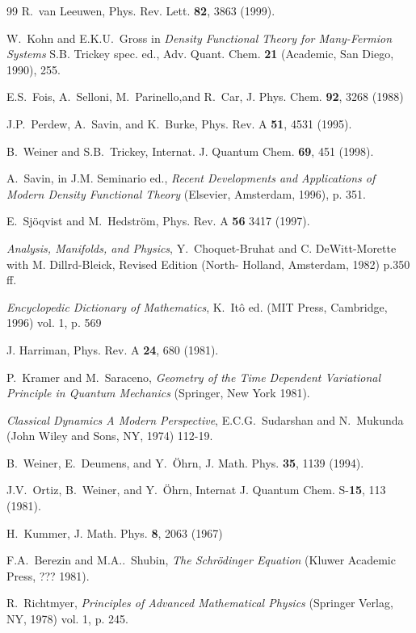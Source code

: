 \documentclass[aps,preprint]{revtex4}%
\begin{document}
\begin{thebibliography}{99}
R.~van Leeuwen, Phys. Rev. Lett. \textbf{82}, 3863 (1999).

W.~Kohn and E.K.U.~Gross in \textit{Density Functional
Theory for Many-Fermion Systems} S.B. Trickey spec. ed., Adv. Quant. Chem.
\textbf{21} (Academic, San Diego, 1990), 255.

E.S.~Fois, A.~Selloni, M.~Parinello,and R.~Car, J. Phys.
Chem. \textbf{92}, 3268 (1988)

J.P.~Perdew, A.~Savin, and K.~Burke, Phys. Rev. A
\textbf{51}, 4531 (1995).

B.~Weiner and S.B.~Trickey, Internat. J. Quantum Chem.
\textbf{69}, 451 (1998).

A.~Savin, in J.M. Seminario ed., \textit{Recent
Developments and Applications of Modern Density Functional Theory} (Elsevier,
Amsterdam, 1996), p. 351.

E.~Sj\"oqvist and M.~Hedstr\"om, Phys. Rev. A \textbf{56}
3417 (1997).

\textit{Analysis, Manifolds, and Physics}, Y.~Choquet-Bruhat
and C. DeWitt-Morette with M. Dillrd-Bleick, Revised Edition (North- Holland,
Amsterdam, 1982) p.350 ff.

\textit{Encyclopedic Dictionary of Mathematics},
K.~It\^o ed. (MIT Press, Cambridge, 1996) vol. 1, p. 569

J. Harriman, Phys. Rev. A \textbf{24}, 680 (1981).

P.~Kramer and M.~Saraceno, \textit{Geometry of the Time
Dependent Variational Principle in Quantum Mechanics} (Springer, New York 1981).

\textit{Classical Dynamics A Modern Perspective},
E.C.G.~Sudarshan and N.~Mukunda (John Wiley and Sons, NY, 1974) 112-19.

B.~Weiner, E.~Deumens, and Y.~\"Ohrn, J. Math. Phys.
\textbf{35}, 1139 (1994).

J.V.~Ortiz, B.~Weiner, and Y.~\"Ohrn, Internat J. Quantum
Chem. S-\textbf{15}, 113 (1981).



H.~Kummer, J. Math. Phys. \textbf{8}, 2063 (1967)

F.A.~Berezin and M.A..~Shubin, \textit{The
Schr\"odinger Equation} (Kluwer Academic Press, ??? 1981).

R.~Richtmyer, \textit{Principles of Advanced Mathematical
Physics} (Springer Verlag, NY, 1978) vol. 1, p. 245.
\end{thebibliography}
\end{document}
